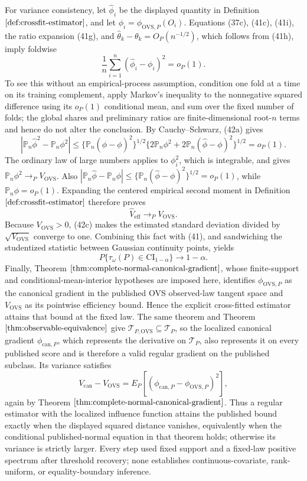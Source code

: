 For variance consistency, let \(\widehat\phi_i\) be the displayed quantity in Definition \(\ref{def:crossfit-estimator}\), and let \(\phi_i=\phi_{\mathrm{OVS},P}(O_i)\).  Equations (37c), (41c), (41i), the ratio expansion (41g), and \(\widehat\theta_k-\theta_k=O_P(n^{-1/2})\), which follows from (41h), imply foldwise
\[
\frac1n\sum_{i=1}^n(\widehat\phi_i-\phi_i)^2=o_P(1).
\tag{42a}
\]
To see this without an empirical-process assumption, condition one fold at a time on its training complement, apply Markov's inequality to the nonnegative squared difference using its \(o_P(1)\) conditional mean, and sum over the fixed number of folds; the global shares and preliminary ratios are finite-dimensional root-\(n\) terms and hence do not alter the conclusion.  By Cauchy--Schwarz, (42a) gives
\[
\left|\mathbb P_n\widehat\phi^2-\mathbb P_n\phi^2\right|
\le \{\mathbb P_n(\widehat\phi-\phi)^2\}^{1/2}
\{2\mathbb P_n\phi^2+2\mathbb P_n(\widehat\phi-\phi)^2\}^{1/2}
=o_P(1).
\tag{42b}
\]
The ordinary law of large numbers applies to \(\phi_i^2\), which is integrable, and gives \(\mathbb P_n\phi^2\to_P V_{\mathrm{OVS}}\).  Also \(|\mathbb P_n\widehat\phi-\mathbb P_n\phi|\le\{\mathbb P_n(\widehat\phi-\phi)^2\}^{1/2}=o_P(1)\), while \(\mathbb P_n\phi=o_P(1)\).  Expanding the centered empirical second moment in Definition \(\ref{def:crossfit-estimator}\) therefore proves
\[
\widehat V_{\mathrm{eff}}\longrightarrow_P V_{\mathrm{OVS}}.
\tag{42c}
\]
Because \(V_{\mathrm{OVS}}>0\), (42c) makes the estimated standard deviation divided by \(\sqrt{V_{\mathrm{OVS}}}\) converge to one.  Combining this fact with (41), and sandwiching the studentized statistic between Gaussian continuity points, yields
\[
P\{\tau_\omega(P)\in\mathrm{CI}_{1-\alpha}\}\longrightarrow1-\alpha.
\]
Finally, Theorem \(\ref{thm:complete-normal-canonical-gradient}\), whose finite-support and conditional-mean-interior hypotheses are imposed here, identifies \(\phi_{\mathrm{OVS},P}\) as the canonical gradient in the published OVS observed-law tangent space and \(V_{\mathrm{OVS}}\) as its pointwise efficiency bound.  Hence the explicit cross-fitted estimator attains that bound at the fixed law.  The same theorem and Theorem \(\ref{thm:observable-equivalence}\) give \(\mathcal T_{P,\mathrm{OVS}}\subseteq\mathcal T_P\), so the localized canonical gradient \(\phi_{\mathrm{can},P}\), which represents the derivative on \(\mathcal T_P\), also represents it on every published score and is therefore a valid regular gradient on the published subclass.  Its variance satisfies
\[
V_{\mathrm{can}}-V_{\mathrm{OVS}}
=E_P[(\phi_{\mathrm{can},P}-\phi_{\mathrm{OVS},P})^2],
\]
again by Theorem \(\ref{thm:complete-normal-canonical-gradient}\).  Thus a regular estimator with the localized influence function attains the published bound exactly when the displayed squared distance vanishes, equivalently when the conditional published-normal equation in that theorem holds; otherwise its variance is strictly larger.  Every step used fixed support and a fixed-law positive spectrum after threshold recovery; none establishes continuous-covariate, rank-uniform, or equality-boundary inference.
